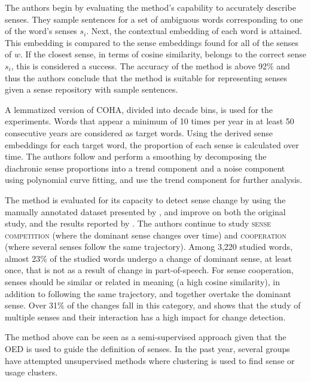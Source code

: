 \documentclass[output=paper]{langsci/langscibook}
\begin{document}
The authors begin by evaluating the method's capability to accurately describe senses.  They sample sentences for a set of ambiguous words corresponding to one of the word's senses $s_i$. Next, the contextual embedding of each word is attained. This embedding is compared to the sense embeddings found for all of the senses of $w$. If the closest sense, in terms of cosine similarity, belongs to the correct sense $s_i$, this is considered a success. The accuracy of the method is above 92\% and thus the authors conclude that the method is suitable for representing senses given a sense repository with sample sentences.   

A lemmatized version of COHA, divided into decade bins, is used for the experiments.  Words that appear a minimum of 10 times per year in at least 50 consecutive years are considered as target words. Using the derived sense embeddings for each target word, the proportion of each sense is calculated over time. The authors follow \citet{tang2016} and perform a smoothing by decomposing the diachronic sense proportions into a trend component and a noise component using polynomial curve fitting, and use the trend component for further analysis.

The method is evaluated for its capacity to detect sense change by using the manually annotated dataset presented by \citet{gulordava-baroni-2011-distributional}, and improve on both the original study, and the results reported by \citet{frermann-lapata-2016-bayesian}.  The authors continue to study \textsc{sense competition} (where the dominant sense changes over time) and \textsc{cooperation} (where several senses follow the same trajectory). Among 3,220 studied words, almost 23\% of the studied words undergo a change of dominant sense, at least once, that is not as a result of change in part-of-speech. For sense cooperation, senses should be similar or related in meaning (a high cosine similarity), in addition to following the same trajectory, and together overtake the dominant sense. Over 31\% of the changes fall in this category, and shows that the study of multiple senses and their interaction has a high impact for change detection. 

The method above can be seen as a semi-supervised approach given that the OED is used to guide the definition of senses. In the past year, several groups have attempted unsupervised methods where clustering is used to find sense or usage clusters.
\end{document}

